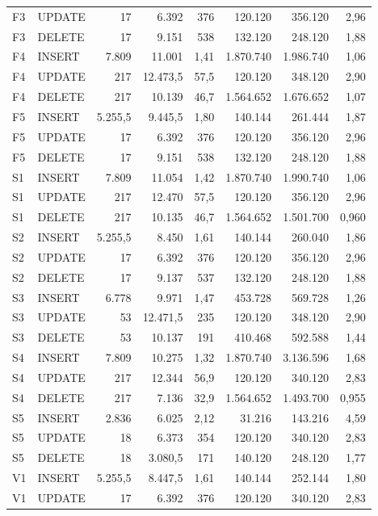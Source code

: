 {\begin{tabular}{llrrrrrr}
F3 & UPDATE & 17 & 6.392 & 376 & 120.120 & 356.120 & 2,96 \\
F3 & DELETE & 17 & 9.151 & 538 & 132.120 & 248.120 & 1,88 \\
F4 & INSERT & 7.809 & 11.001 & 1,41 & 1.870.740 & 1.986.740 & 1,06 \\
F4 & UPDATE & 217 & 12.473,5 & 57,5 & 120.120 & 348.120 & 2,90 \\
F4 & DELETE & 217 & 10.139 & 46,7 & 1.564.652 & 1.676.652 & 1,07 \\
F5 & INSERT & 5.255,5 & 9.445,5 & 1,80 & 140.144 & 261.444 & 1,87 \\
F5 & UPDATE & 17 & 6.392 & 376 & 120.120 & 356.120 & 2,96 \\
F5 & DELETE & 17 & 9.151 & 538 & 132.120 & 248.120 & 1,88 \\
S1 & INSERT & 7.809 & 11.054 & 1,42 & 1.870.740 & 1.990.740 & 1,06 \\
S1 & UPDATE & 217 & 12.470 & 57,5 & 120.120 & 356.120 & 2,96 \\
S1 & DELETE & 217 & 10.135 & 46,7 & 1.564.652 & 1.501.700 & 0,960 \\
S2 & INSERT & 5.255,5 & 8.450 & 1,61 & 140.144 & 260.040 & 1,86 \\
S2 & UPDATE & 17 & 6.392 & 376 & 120.120 & 356.120 & 2,96 \\
S2 & DELETE & 17 & 9.137 & 537 & 132.120 & 248.120 & 1,88 \\
S3 & INSERT & 6.778 & 9.971 & 1,47 & 453.728 & 569.728 & 1,26 \\
S3 & UPDATE & 53 & 12.471,5 & 235 & 120.120 & 348.120 & 2,90 \\
S3 & DELETE & 53 & 10.137 & 191 & 410.468 & 592.588 & 1,44 \\
S4 & INSERT & 7.809 & 10.275 & 1,32 & 1.870.740 & 3.136.596 & 1,68 \\
S4 & UPDATE & 217 & 12.344 & 56,9 & 120.120 & 340.120 & 2,83 \\
S4 & DELETE & 217 & 7.136 & 32,9 & 1.564.652 & 1.493.700 & 0,955 \\
S5 & INSERT & 2.836 & 6.025 & 2,12 & 31.216 & 143.216 & 4,59 \\
S5 & UPDATE & 18 & 6.373 & 354 & 120.120 & 340.120 & 2,83 \\
S5 & DELETE & 18 & 3.080,5 & 171 & 140.120 & 248.120 & 1,77 \\
V1 & INSERT & 5.255,5 & 8.447,5 & 1,61 & 140.144 & 252.144 & 1,80 \\
V1 & UPDATE & 17 & 6.392 & 376 & 120.120 & 340.120 & 2,83 \\

\end{tabular}}
